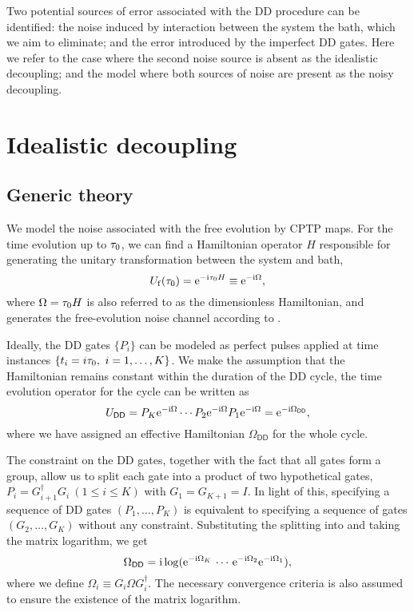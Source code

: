 \documentclass[aps,pra,reprint,superscriptaddress]{revtex4-2}
\newcommand{\Odd}{\Omega_{\mathsf{DD}}}
\begin{document}
Two potential sources of error associated with the DD procedure can be identified: the noise induced by interaction between the system the bath, which we aim to eliminate; and the error introduced by the imperfect DD gates.
Here we refer to the case where the second noise source is absent as the idealistic decoupling; and the model where both sources of noise are present as the noisy decoupling.



\section{Idealistic decoupling}
\subsection{Generic theory}
We model the noise associated with the free evolution by
CPTP maps. For the time evolution up to $\tau_0$, we can find a Hamiltonian operator $H$ responsible for generating the unitary transformation between the system and bath,
\begin{equation}
    U_{\mathrm{f}}(\tau_0)= \mathrm{e}^{-\mathrm{i} \tau_0 H}\equiv\mathrm{e}^{-\mathrm{i} \Omega},
\end{equation}
where $\Omega=\tau_0 H$ is also referred to as the dimensionless Hamiltonian, and generates the free-evolution noise channel according to .

Ideally, the DD gates $\{P_i\}$ can be modeled as perfect pulses applied at time instances $\{t_i = i \tau_0,\ i=1,\ldots, K\}$. 
We make the assumption that the Hamiltonian remains constant within the duration of the DD cycle,
the time evolution operator for the cycle can be written as
\begin{equation}\label{eq:UDD-ideal}
    U_\sDD =P_K \upe^{-\upi \Omega}   \cdots P_2\upe^{-\upi \Omega} P_1\upe^{-\upi \Omega} = \upe^{-\upi \Odd},
\end{equation}
where we have assigned 
an effective Hamiltonian $\Odd$  for the whole cycle.

The constraint  on the DD gates, together with the fact that all gates form a group, allow us to split each gate into a product of two hypothetical gates, $P_i = G_{i+1}^\dagger G_{i} \ (1 \le i \le K)$ with $G_1 = G_{K+1}= I$.
In light of this, specifying a sequence of DD gates $(P_1, \ldots ,P_K)$ is equivalent to specifying a sequence of gates $(G_2, \ldots ,G_K)$ without any constraint.
Substituting the splitting into  and taking the matrix logarithm, we get
\begin{equation}\label{eq:formal-Odd}
\Odd = \upi \log( 
\upe^{-\upi \Omega_K} \, \cdots \,\upe^{-\upi\Omega_2} \upe^{-\upi \Omega_1} ),
\end{equation}
where we define $\Omega_i \equiv G_i \Omega G_i^\dagger$.
The necessary convergence criteria is also assumed to ensure the existence of the matrix logarithm.
\end{document}
